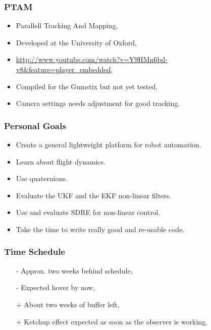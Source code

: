 \documentclass{beamer}
\begin{document}
\begin{frame}
    \frametitle{PTAM}
    \begin{itemize}
        \item Parallell Tracking And Mapping,
        \item Developed at the University of Oxford,
        \item \url{http://www.youtube.com/watch?v=Y9HMn6bd-v8&feature=player_embedded},
        \item Compiled for the Gumstix but not yet tested,
        \item Camera settings needs adjustment for good tracking.
    \end{itemize}
\end{frame}
\begin{frame}
    \frametitle{Personal Goals}
    \begin{itemize}
        \item Create a general lightweight platform for robot automation.
        \item Learn about flight dynamics.
        \item Use quaternions.
        \item Evaluate the UKF and the EKF non-linear filters.
        \item Use and evaluate SDRE for non-linear control.
        \item Take the time to write really good and re-usable code.
    \end{itemize}
\end{frame}

\begin{frame}
    \frametitle{Time Schedule}
    \begin{itemize}
        \item[-] Approx. two weeks behind schedule,
        \item[-] Expected hover by now,
        \item[+] About two weeks of buffer left,
        \item[+] Ketchup effect expected as soon as the observer is working.
    \end{itemize}
\end{frame}
\end{document}
